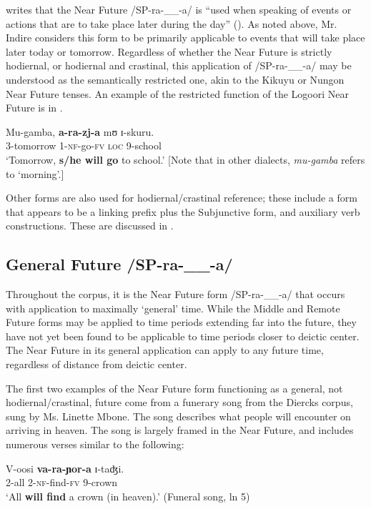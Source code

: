 \documentclass[output=paper]{langsci/langscibook}
\begin{document}
\citeauthor{Leung1991} writes that the Near Future /SP-ra-\_\_-a/ is “used when speaking of events or actions that are to take place later during the day” (\citeyear[174]{Leung1991}). As noted above, Mr. Indire considers this form to be primarily applicable to events that will take place later today or tomorrow. Regardless of whether the Near Future is strictly hodiernal, or hodiernal and crastinal, this application of /SP-ra-\_\_-a/ may be understood as the semantically restricted one, akin to the Kikuyu or Nungon Near Future tenses. An example of the restricted function of the Logoori Near Future is in . 

\ea\label{ex:sarvasy:1}
\gll Mu-gamba,   \textbf{a-ra-zj-a}   mʊ  ɪ{}-skuru. \\
3-tomorrow  1-\textsc{nf}{}-go-\textsc{fv}  \textsc{loc}  9-school \\
\glt ‘Tomorrow, \textbf{s/he will go} to school.’ [Note that in other dialects, \textit{mu-gamba }refers to ‘morning’.] \z

Other forms are also used for hodiernal/crastinal reference; these include a form that appears to be a linking prefix plus the Subjunctive form, and auxiliary verb constructions. These are discussed in .

\subsection{General Future /SP-ra-\_\_-a/}
\label{sec:sarvasy:3.2}

Throughout the corpus, it is the Near Future form /SP-ra-\_\_-a/ that occurs with application to maximally ‘general’ time. While the Middle and Remote Future forms may be applied to time periods extending far into the future, they have not yet been found to be applicable to time periods closer to deictic center. The Near Future in its general application can apply to any future time, regardless of distance from deictic center. 

The first two examples of the Near Future form functioning as a general, not hodiernal/crastinal, future come from a funerary song from the Diercks corpus, sung by Ms. Linette Mbone. The song describes what people will encounter on arriving in heaven. The song is largely framed in the Near Future, and includes numerous verses similar to the following:

\ea\label{ex:sarvasy:2}
\gll V-oosi   \textbf{va-ra-ɲor-a}     ɪ{}-taʤi. \\
2-all 2-\textsc{nf}{}-find-\textsc{fv}    9-crown \\
\glt ‘All \textbf{will find} a crown (in heaven).’ (Funeral song, ln 5)
\z
\end{document}
